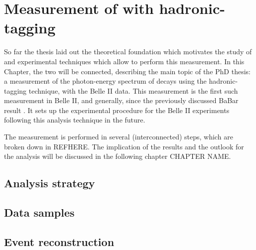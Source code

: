 \chapter{Measurement of \safeBtoXsgamma with hadronic-tagging}

So far the thesis laid out the theoretical foundation which motivates the study of \BtoXsgamma 
and experimental techniques which allow to perform this measurement.
In this Chapter, the two will be connected, describing the main topic of the PhD thesis: 
a measurement of the photon-energy spectrum of \BtoXsgamma decays using the hadronic-tagging technique,
with the Belle II data.
This measurement is the first such measurement in Belle II, and generally, since the previously discussed BaBar result \cite{BaBar:2007yhb}.
It sets up the experimental procedure for the Belle II experiments following this analysis technique in the future.

The measurement is performed in several (interconnected) steps, which are broken down in REFHERE.
The implication of the results and the outlook for the analysis will be discussed in the following chapter CHAPTER NAME.


\section{Analysis strategy}\label{sec:analysis_strategy}


\section{Data samples}\label{sec:data_samples}


\section{Event reconstruction}\label{sec:event_reconstruction}

